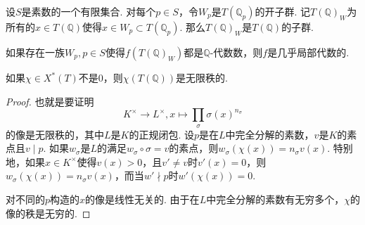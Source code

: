 设$S$是素数的一个有限集合. 对每个$p\in S$，令$W_p$是$T(\mathbb{Q}_p)$的开子群. 记$T(\mathbb{Q})_{W}$为所有的$x\in T(\mathbb{Q})$使得$x\in W_p\subset T(\mathbb{Q}_p)$. 那么$T(\mathbb{Q})_{W}$是$T(\mathbb{Q})$的子群.

\begin{cprop}
    如果存在一族$W_p, p\in S$使得$f(T(\mathbb{Q})_W)$都是$\mathbb{Q}$-代数数，则$f$是几乎局部代数的. \label{temp::reps::loc_alg}
\end{cprop}

\begin{clem}
    如果$\chi\in X^{*}(T)$不是$0$，则$\chi(T(\mathbb{Q}))$是无限秩的.
\end{clem}

\begin{proof}
    也就是要证明
    \begin{equation}
        K^{\times}\to L^{\times}, x\mapsto \prod_{\sigma} \sigma(x)^{n_{\sigma}}
    \end{equation}
    的像是无限秩的，其中$L$是$K$的正规闭包. 设$p$是在$L$中完全分解的素数，$v$是$K$的素点且$v\mid p$.
    如果$w_{\sigma}$是$L$的满足$w_{\sigma}\circ\sigma=v$的素点，则$w_{\sigma}(\chi(x)) = n_{\sigma}v(x)$.
    特别地，如果$x\in K^{\times}$使得$v(x) > 0$，且$v'\neq v$时$v'(x) = 0$，则$w_{\sigma}(\chi(x)) = n_{\sigma}v(x)$，而当$w'\nmid p$时$w'(\chi(x))=0$.

    对不同的$p$构造的$x$的像是线性无关的. 由于在$L$中完全分解的素数有无穷多个，$\chi$的像的秩是无穷的.
\end{proof}

